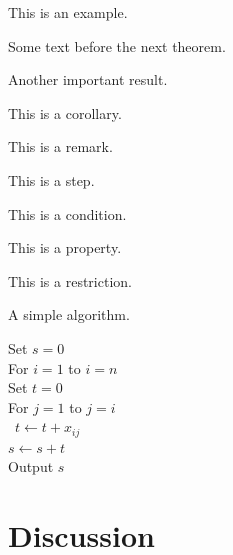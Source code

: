 \documentclass[lineno]{biometrika}
\begin{document}
\begin{example}
This is an example.
\end{example}

Some text before the next theorem.

\begin{theorem}
Another important result.
\end{theorem}

\begin{corollary}
This is a corollary.
\end{corollary}

\begin{remark}
This is a remark.
\end{remark}

\begin{step}
This is a step.
\end{step}

\begin{condition}
This is a condition.
\end{condition}


\begin{property}
This is a property.
\end{property}

\begin{restrictions}
This is a restriction.
\end{restrictions}

\begin{algo}
A simple algorithm.
\begin{tabbing}
   \qquad \enspace Set $s=0$\\
   \qquad \enspace For $i=1$ to $i=n$ \\
   \qquad \qquad Set $t=0$\\
   \qquad \qquad For $j=1$ to $j=i$ \\\
  \qquad \qquad\qquad  $t \leftarrow t + x_{ij}$ \\
\qquad \qquad $s \leftarrow s + t$ \\
\qquad \enspace Output $s$
\end{tabbing}
\end{algo}




\section{Discussion}
\end{document}

